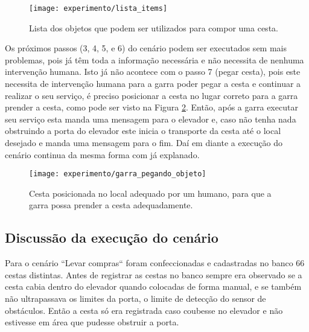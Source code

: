 \begin{figure}[!htb] \centering 
  \centering
  \texttt{[image: experimento/lista\_items]} 
  \caption{Lista dos objetos que podem ser utilizados para compor uma cesta.} 
  \label{fig:lista_objetos}
\end{figure}

Os próximos passos (3, 4, 5, e 6) do cenário podem ser executados sem mais problemas, pois já têm toda a informação necessária e não necessita de nenhuma intervenção humana. Isto já não acontece com o passo 7 (pegar cesta), pois este necessita de intervenção humana para a garra poder pegar a cesta e continuar a realizar o seu serviço, é preciso posicionar a cesta no lugar correto para a garra prender a cesta, como pode ser visto na Figura \ref{fig:garra_pegando_objeto}. Então, após a garra executar seu serviço esta manda uma mensagem para o elevador e, caso não tenha nada obstruindo a porta do elevador este inicia o transporte da cesta até o local desejado e manda uma mensagem para o fim. Daí em diante a execução do cenário continua da mesma forma com já explanado.

\begin{figure}[!htb] \centering 
  \centering
  \texttt{[image: experimento/garra\_pegando\_objeto]} 
  \caption{Cesta posicionada no local adequado por um humano, para que a garra possa prender a cesta adequadamente.} 
  \label{fig:garra_pegando_objeto}
\end{figure}

\subsection{Discussão da execução do cenário}
Para o cenário ``Levar compras`` foram confeccionadas e cadastradas no banco 66 cestas distintas. Antes de registrar as cestas no banco sempre era observado se a cesta cabia dentro do elevador quando colocadas de forma manual, e se também não ultrapassava os limites da porta, o limite de detecção do sensor de obstáculos. Então a cesta só era registrada caso coubesse no elevador e não estivesse em área que pudesse obstruir a porta. 

